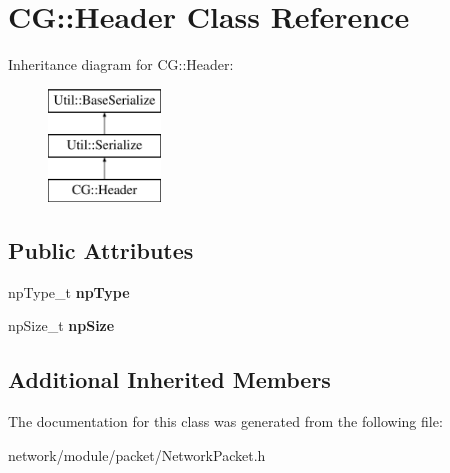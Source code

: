 \hypertarget{class_c_g_1_1_header}{}\section{CG\+:\+:Header Class Reference}
\label{class_c_g_1_1_header}
Inheritance diagram for CG\+:\+:Header\+:\begin{figure}[H]
\begin{center}
\leavevmode
\includegraphics[height=3.000000cm]{class_c_g_1_1_header}
\end{center}
\end{figure}
\subsection*{Public Attributes}
\begin{DoxyCompactItemize}
\item 
\mbox{\label{class_c_g_1_1_header_ad3df9a72b81681aec34ac69b0819e1ab}} 
np\+Type\+\_\+t {\bfseries np\+Type}
\item 
\mbox{\label{class_c_g_1_1_header_a76633474a7a00ba8b262a8a5210c41a7}} 
np\+Size\+\_\+t {\bfseries np\+Size}
\end{DoxyCompactItemize}
\subsection*{Additional Inherited Members}


The documentation for this class was generated from the following file\+:\begin{DoxyCompactItemize}
\item 
network/module/packet/Network\+Packet.\+h\end{DoxyCompactItemize}
